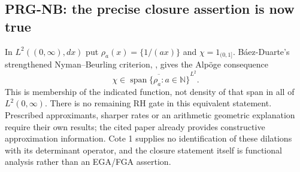 \subsection{PRG-NB: the precise closure assertion is now true}
In $L^2((0,\infty),dx)$ put $\rho_a(x)=\{1/(ax)\}$ and $\chi=1_{(0,1]}$. B\'aez-Duarte's strengthened Nyman--Beurling criterion, \cite[Theorem 1.1]{baez}, gives the Alp\"oge consequence
\[
 \chi\in\overline{\operatorname{span}\{\rho_a:a\in\mathbb N\}}^{L^2}.
\]
This is membership of the indicated function, not density of that span in all of $L^2(0,\infty)$. There is no remaining RH gate in this equivalent statement. Prescribed approximants, sharper rates or an arithmetic geometric explanation require their own results; the cited paper already provides constructive approximation information. Cote 1 supplies no identification of these dilations with its determinant operator, and the closure statement itself is functional analysis rather than an EGA/FGA assertion.

